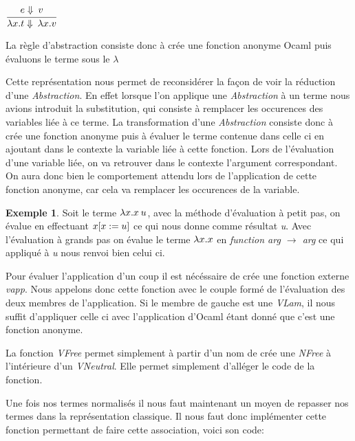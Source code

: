 \documentclass {article}
\newcommand{\codefrom}[3]
           {}
\theoremstyle{definition}
\newtheorem{example}{Exemple}
\theoremstyle{remark}
\begin{document}
\codefrom{typed}{lambda}{big_step_eval_inTm_inv}

\codefrom{typed}{lambda}{big_step_eval_inTm_abs}

$\cfrac{e \Downarrow \: v}
  {\lambda x.t \Downarrow \: \lambda x.v}$


La règle d'abstraction consiste donc à crée une fonction anonyme Ocaml puis évaluons 
le terme sous le $\lambda$

Cette représentation nous permet de reconsidérer la façon de voir la 
réduction d'une \emph{Abstraction}. En effet lorsque l'on applique une \emph{Abstraction}
à un terme nous avions introduit la substitution, qui consiste à remplacer les occurences 
des variables liée à ce terme. La transformation d'une \emph{Abstraction} consiste donc à 
crée une fonction anonyme puis à évaluer le terme contenue dans celle ci en ajoutant dans le 
contexte la variable liée à cette fonction. Lors de l'évaluation d'une variable liée, on va
retrouver dans le contexte l'argument correspondant. On aura donc bien le comportement attendu
lors de l'application de cette fonction anonyme, car cela va remplacer les occurences de la 
variable.

\begin{example}
  Soit le terme \(\lambda x. x\:u\), avec la méthode d'évaluation à petit pas,
  on évalue en effectuant $x[x := u]$ ce qui nous donne comme résultat
  \emph{u}. 
  Avec l'évaluation à grands pas on évalue le terme $\lambda x. x$ en 
  \emph{function arg $\rightarrow$ arg} ce qui appliqué à \emph{u} nous renvoi bien celui ci.
\end{example}

Pour évaluer l'application d'un coup il est nécéssaire de crée une fonction externe \emph{vapp}.
Nous appelons donc cette fonction avec le couple formé de l'évaluation des deux membres de l'application.
Si le membre de gauche est une \emph{VLam}, il nous suffit d'appliquer celle ci avec l'application d'Ocaml
étant donné que c'est une fonction anonyme.

La fonction \emph{VFree} permet simplement à partir d'un nom de crée une \emph{NFree}
à l'intérieure d'un \emph{VNeutral}.
Elle permet simplement d'alléger le code de la fonction.

\codefrom{typed}{lambda}{vfree}



Une fois nos termes normalisés il nous faut maintenant un moyen de repasser nos termes
dans la représentation classique. Il nous faut donc implémenter cette fonction permettant de 
faire cette association, voici son code:
\end{document}

